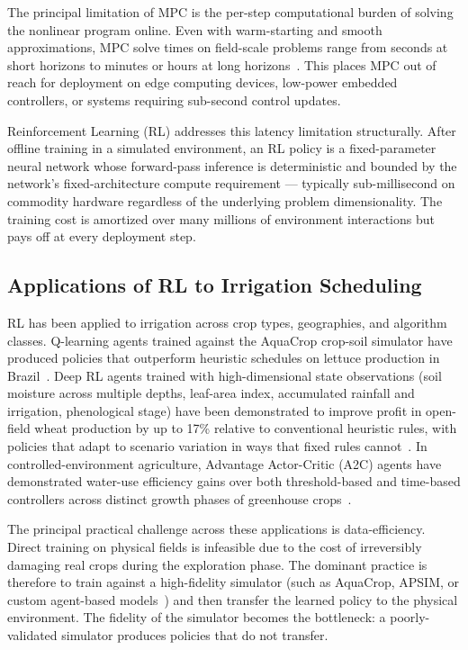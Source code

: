 The principal limitation of MPC is the per-step computational burden
of solving the nonlinear program online. Even with warm-starting and
smooth approximations, MPC solve times on field-scale problems range
from seconds at short horizons to minutes or hours at long
horizons~\cite{Lopezjimenez2024}. This places MPC out of reach for
deployment on edge computing devices, low-power embedded controllers,
or systems requiring sub-second control updates.

Reinforcement Learning (RL) addresses this latency limitation
structurally. After offline training in a simulated environment, an
RL policy is a fixed-parameter neural network whose forward-pass
inference is deterministic and bounded by the network's
fixed-architecture compute requirement --- typically sub-millisecond
on commodity hardware regardless of the underlying problem
dimensionality. The training cost is amortized over many millions of
environment interactions but pays off at every deployment step.

\subsection{Applications of RL to Irrigation Scheduling}

RL has been applied to irrigation across crop types, geographies, and
algorithm classes. Q-learning agents trained against the AquaCrop
crop-soil simulator have produced policies that outperform heuristic
schedules on lettuce production in Brazil~\cite{Sharma2025}. Deep
RL agents trained with high-dimensional state observations (soil
moisture across multiple depths, leaf-area index, accumulated rainfall
and irrigation, phenological stage) have been demonstrated to improve
profit in open-field wheat production by up to 17\% relative to
conventional heuristic rules, with policies that adapt to scenario
variation in ways that fixed rules cannot~\cite{Bayar2025,Hu2025}. In
controlled-environment agriculture, Advantage Actor-Critic (A2C)
agents have demonstrated water-use efficiency gains over both
threshold-based and time-based controllers across distinct growth
phases of greenhouse crops~\cite{Bayar2025}.

The principal practical challenge across these applications is
data-efficiency. Direct training on physical fields is infeasible
due to the cost of irreversibly damaging real crops during the
exploration phase. The dominant practice is therefore to train
against a high-fidelity simulator (such as AquaCrop, APSIM, or
custom agent-based models~\cite{Lopezjimenez2024}) and then transfer
the learned policy to the physical environment. The fidelity of the
simulator becomes the bottleneck: a poorly-validated simulator
produces policies that do not transfer.

